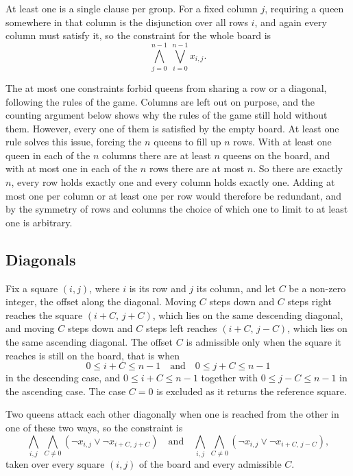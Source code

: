 \documentclass[11pt,a4paper]{article}
\begin{document}
At least one is a single clause per group. For a fixed column $j$, requiring
a queen somewhere in that column is the disjunction over all rows $i$, and
again every column must satisfy it, so the constraint for the whole board is
\[
  \bigwedge_{j=0}^{n-1} \ \bigvee_{i=0}^{n-1} x_{i,j}.
\]

The at most one constraints forbid queens from sharing a row or a
diagonal, following the rules of the game. Columns are left out on purpose, and
the counting argument below shows why the rules of the game still hold without
them. However, every one of them is satisfied by the empty board.
At least one rule solves this issue, forcing the $n$ queens to fill up $n$ rows.
With at least one queen in each of the $n$
columns there are at least $n$ queens on the board, and with at most one in
each of the $n$ rows there are at most $n$. So there are exactly $n$, every
row holds exactly one and every column holds exactly one. Adding at most one
per column or at least one per row would therefore be redundant, and by the
symmetry of rows and columns the choice of which one to limit to at least one is arbitrary.

\subsection*{Diagonals}

Fix a square $(i,j)$, where $i$ is its row and $j$ its column, and let $C$
be a non-zero integer, the offset along the diagonal. Moving $C$ steps down
and $C$ steps right reaches the square $(i+C,\, j+C)$, which lies on the
same descending diagonal, and moving $C$ steps down and $C$ steps left
reaches $(i+C,\, j-C)$, which lies on the same ascending diagonal. The
offset $C$ is admissible only when the square it reaches is still on the
board, that is when
\[
  0 \le i+C \le n-1
  \quad\text{and}\quad
  0 \le j+C \le n-1
\]
in the descending case, and $0 \le i+C \le n-1$ together with
$0 \le j-C \le n-1$ in the ascending case. The case $C = 0$ is excluded
as it returns the reference square.

Two queens attack each other diagonally when one is reached from the
other in one of these two ways, so the constraint is
\[
  \bigwedge_{i,j} \ \bigwedge_{C \neq 0}
  \left( \neg x_{i,j} \vee \neg x_{i+C,\,j+C} \right)
  \quad\text{and}\quad
  \bigwedge_{i,j} \ \bigwedge_{C \neq 0}
  \left( \neg x_{i,j} \vee \neg x_{i+C,\,j-C} \right),
\]
taken over every square $(i,j)$ of the board and every admissible $C$.
\end{document}
